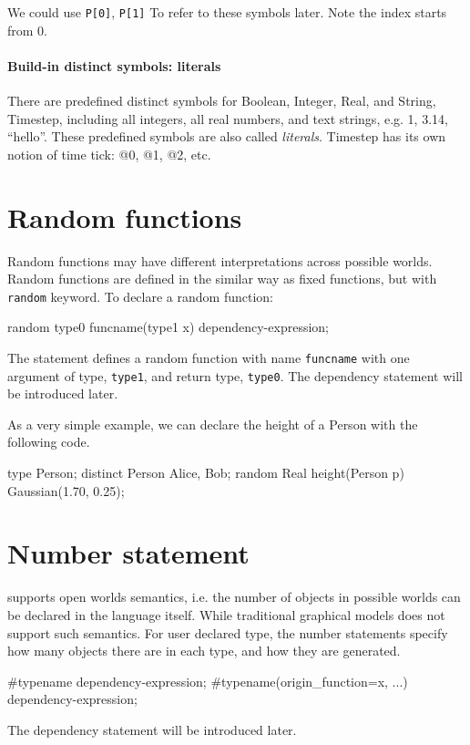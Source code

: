\documentclass[12pt]{article}
\begin{document}
We could use \verb|P[0]|, \verb|P[1]| To refer to these symbols later. Note the index starts from 0.

\paragraph{Build-in distinct symbols: literals}
There are predefined distinct symbols for Boolean, Integer,  Real, and String, Timestep, including all integers, all real numbers, and text strings, e.g. 1, 3.14, ``hello''. These predefined symbols are also called {\em literals}. Timestep has its own notion of time tick: @0, @1, @2, etc. 



\section{Random functions}
Random functions may have different interpretations across possible worlds. Random functions are defined in the similar way as fixed functions, but with \texttt{random} keyword.
To declare a random function:
\begin{blogcode}
random type0 funcname(type1 x) dependency-expression;
\end{blogcode}
The statement defines a random function with name \texttt{funcname} with one argument of type, \texttt{type1}, and return type, \texttt{type0}.  The dependency statement will be introduced later. 

As a very simple example, we can declare the height of a Person with the following code. 
\begin{blogcode}
type Person;
distinct Person Alice, Bob;
random Real height(Person p) ~ Gaussian(1.70, 0.25);
\end{blogcode}



\section{Number statement}
\bl supports open worlds semantics, i.e. the number of objects in possible worlds can be declared in the language itself. While traditional graphical models does not support such semantics. 
For user declared type, the number statements specify how many objects there are in each type, and how they are generated. 
\begin{blogcode}
#typename dependency-expression;
#typename(origin_function=x, ...) dependency-expression;
\end{blogcode}
The dependency statement will be introduced later. 
\end{document}
